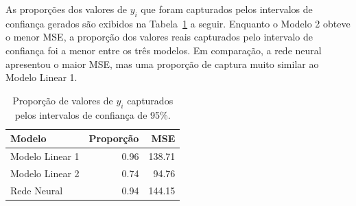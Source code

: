 \documentclass[
  a4paperpaper,
]{article}
\newenvironment{Shaded}{\begin{snugshade}}{\end{snugshade}}
\newcommand{\AttributeTok}[1]{\textcolor[rgb]{0.40,0.45,0.13}{#1}}
\newcommand{\CommentTok}[1]{\textcolor[rgb]{0.37,0.37,0.37}{#1}}
\newcommand{\DecValTok}[1]{\textcolor[rgb]{0.68,0.00,0.00}{#1}}
\newcommand{\FloatTok}[1]{\textcolor[rgb]{0.68,0.00,0.00}{#1}}
\newcommand{\FunctionTok}[1]{\textcolor[rgb]{0.28,0.35,0.67}{#1}}
\newcommand{\NormalTok}[1]{\textcolor[rgb]{0.00,0.23,0.31}{#1}}
\newcommand{\OtherTok}[1]{\textcolor[rgb]{0.00,0.23,0.31}{#1}}
\newcommand{\SpecialCharTok}[1]{\textcolor[rgb]{0.37,0.37,0.37}{#1}}
\begin{document}
\begin{Shaded}
\end{Shaded}

As proporções dos valores de \(y_i\) que foram capturados pelos
intervalos de confiança gerados são exibidos na
Tabela~\ref{tbl-intervalos-confianca} a seguir. Enquanto o Modelo 2
obteve o menor MSE, a proporção dos valores reais capturados pelo
intervalo de confiança foi a menor entre os três modelos. Em comparação,
a rede neural apresentou o maior MSE, mas uma proporção de captura muito
similar ao Modelo Linear 1.

\begin{longtable}[]{@{}lrr@{}}

\caption{\label{tbl-intervalos-confianca}Proporção de valores de \(y_i\)
capturados pelos intervalos de confiança de 95\%.}

\tabularnewline

\toprule\noalign{}
Modelo & Proporção & MSE \\
\midrule\noalign{}
\endhead
\bottomrule\noalign{}
\endlastfoot
Modelo Linear 1 & 0.96 & 138.71 \\
Modelo Linear 2 & 0.74 & 94.76 \\
Rede Neural & 0.94 & 144.15 \\

\end{longtable}
\end{document}
